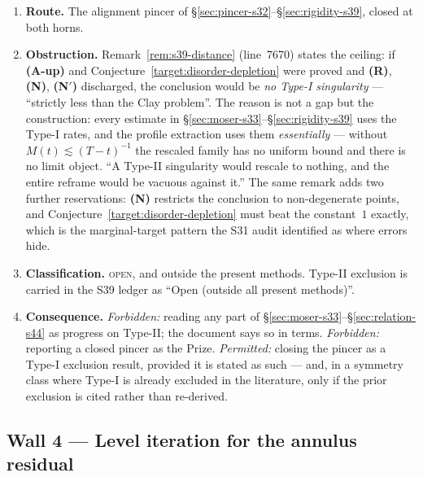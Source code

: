 \documentclass[11pt]{article}
\theoremstyle{definition}
\theoremstyle{remark}
\begin{document}
\begin{enumerate}[label=(\alph*),leftmargin=2.2em]
  \item \textbf{Route.} The alignment pincer of
    \S\ref{sec:pincer-s32}--\S\ref{sec:rigidity-s39}, closed at both horns.
  \item \textbf{Obstruction.} Remark~\ref{rem:s39-distance} (line~7670)
    states the ceiling: if \textbf{(A-up)} and
    Conjecture~\ref{target:disorder-depletion} were proved and
    \textbf{(R)}, \textbf{(N)}, \textbf{(N$'$)} discharged, the conclusion
    would be \emph{no Type-I singularity} --- ``strictly less than the Clay
    problem''. The reason is not a gap but the construction: every estimate
    in \S\ref{sec:moser-s33}--\S\ref{sec:rigidity-s39} uses the Type-I rates,
    and the profile extraction uses them \emph{essentially} --- without
    $M(t)\lesssim(T-t)^{-1}$ the rescaled family has no uniform bound and
    there is no limit object. ``A Type-II singularity would rescale to
    nothing, and the entire reframe would be vacuous against it.'' The same
    remark adds two further reservations: \textbf{(N)} restricts the
    conclusion to non-degenerate points, and
    Conjecture~\ref{target:disorder-depletion} must beat the constant~$1$
    exactly, which is the marginal-target pattern the S31 audit identified as
    where errors hide.
  \item \textbf{Classification.} \textsc{open}, and outside the present
    methods. Type-II exclusion is carried in the S39 ledger as ``Open
    (outside all present methods)''.
  \item \textbf{Consequence.} \emph{Forbidden:} reading any part of
    \S\ref{sec:moser-s33}--\S\ref{sec:relation-s44} as progress on Type-II;
    the document says so in terms. \emph{Forbidden:} reporting a closed
    pincer as the Prize. \emph{Permitted:} closing the pincer as a Type-I
    exclusion result, provided it is stated as such --- and, in a symmetry
    class where Type-I is already excluded in the literature, only if the
    prior exclusion is cited rather than re-derived.
\end{enumerate}

\subsection{Wall 4 --- Level iteration for the annulus residual}
\label{subsec:wall4-levels}
\end{document}

